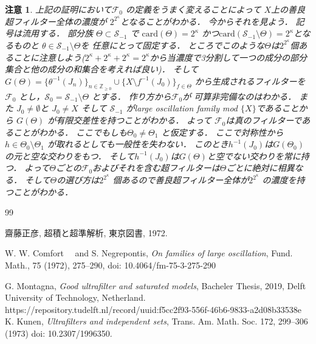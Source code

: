 \documentclass[leqno, a4paper, 12pt]{jsarticle}
\newtheorem*{rmk}{注意}
\newcommand{\zz}{\mathbb{Z}}
\newcommand{\card}{\mathrm{card}}
\newcommand{\myfil}[1]{\mathcal{#1}}
\newcommand{\myfam}[1]{\mathscr{#1}}
\begin{document}
\begin{rmk}
上記の証明において$\myfil{F}_{0}$
の定義をうまく変えることによって
$X$上の善良超フィルター全体の濃度が
$2^{2^{\kappa}}$となることがわかる．
今からそれを見よう．
記号は流用する．
部分族
$\Theta\subset \myfam{S}_{-1}$
で
$\card(\Theta)=2^{\kappa}$
かつ$\card(\myfam{S}_{-1}\setminus \Theta)=2^{\kappa}$となるものと
$\theta\in \myfam{S}_{-1}\setminus \Theta$を
任意にとって固定する．
ところでこのような$\Theta$は$2^{2^{\kappa}}$個あることに注意しよう($2^{\kappa}+2^{\kappa}+2^{\kappa}=2^{\kappa}$から当濃度で3分割して一つの成分の部分集合と他の成分の和集合を考えれば良い)．
そして
$G(\Theta)=\{\theta^{-1}(J_{n})\}_{n\in\zz_{\ge 0}}\cup \{X\setminus f^{-1}(J_{0})\}_{f\in \Theta}$
から生成されるフィルターを$\myfil{F}_{0}$
とし，$\myfam{S}_{0}=\myfam{S}_{-1}\setminus \Theta$
とする．
作り方から$\myfil{F}_{0}$が
可算非完備なのはわかる．
また
$J_{0}\neq \emptyset$と
$J_{0}\neq X$
そして
$\myfam{S}_{-1}$
がlarge oscillation family mod 
$\{X\}$であることから
$G(\Theta)$
が有限交差性を持つことがわかる．
よって
$\myfil{F}_{0}$は真のフィルターであることがわかる．
ここでもしも$\Theta_{0}\neq \Theta_{1}$
と仮定する．
ここで対称性から$h\in \Theta_{0}\setminus \Theta_{1}$
が取れるとしても一般性を失わない．
このとき$h^{-1}(J_{0})$は$G(\Theta_{0})$
の元と空な交わりをもつ．
そして$h^{-1}(J_{0})$は$G(\Theta)$と空でない交わりを常に持つ．
よって$\Theta$ごとの$\myfil{F}_{0}$およびそれを含む超フィルターは$\Theta$ごとに絶対に相異なる．
そして$\Theta$の選び方は$2^{2^{\kappa}}$
個あるので善良超フィルター全体が$2^{2^{\kappa}}$
の濃度を持つことがわかる．
\end{rmk}


\begin{thebibliography}{99}

齋藤正彦, 
超積と超準解析, 
東京図書, 1972. 

W. W. Comfort　 and S.  Negrepontis, 
\textit{On families of large oscillation}, 
Fund. Math., 
75 (1972), 
275--290, 
 doi: 10.4064/fm-75-3-275-290



G. Montagna, 
\textit{Good ultrafilter and saturated models}, 
Bacheler Thesis, 
2019, 
Delft University of Technology, 
Netherland. 
https://repository.tudelft.nl/record/uuid:f5cc2f93-556f-46b6-9833-a2d08b33538e
K. Kunen, 
\textit{Ultrafilters and independent sets}, 
Trans. Am. Math. Soc. 172, 299--306 (1973)
 doi: 10.2307/1996350. 
 
 


\end{thebibliography}
\end{document}
